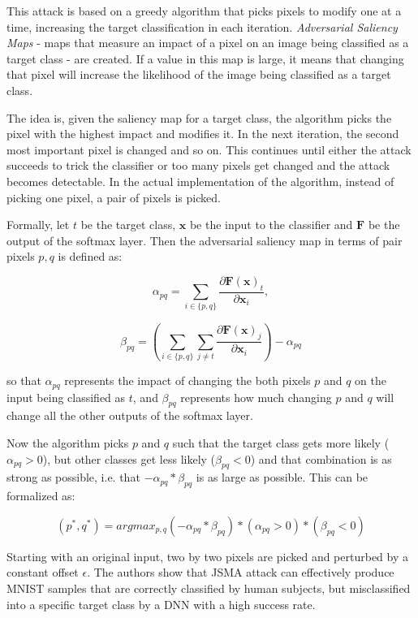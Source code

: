 This attack is based on a greedy algorithm that picks pixels to modify one at a time, increasing the target classification in each iteration.  \textit{Adversarial Saliency Maps} - maps that measure an impact of a pixel on an image being classified as a target class - are created. If a value in this map is large, it means that changing that pixel will increase the likelihood of the image being classified as a target class. 

The idea is, given the saliency map for a target class, the algorithm picks the pixel with the highest impact and modifies it. In the next iteration, the second most important pixel is changed and so on. This continues until either the attack succeeds to trick the classifier or too many pixels get changed and the attack becomes detectable. In the actual implementation of the algorithm, instead of picking one pixel, a pair of pixels is picked.

Formally, let $t$ be the target class, $\pmb x$ be the input to the classifier and $\pmb F$ be the output of the softmax layer. Then the adversarial saliency map in terms of pair pixels $p, q$ is defined as:

\[
\alpha_{pq} = \sum_{i \in \{p,q\}} \frac{\partial \pmb F(\pmb x)_t}{\partial \pmb x_i},
\]

\[
\beta_{pq} = ( \sum_{i \in \{p,q\}} \sum_{j \neq t} \frac{\partial \pmb F (\pmb x)_j }{\partial \pmb x _i}) - \alpha_{pq}
\]

so that $\alpha_{pq}$ represents the impact of changing the both pixels $p$ and $q$ on the input being classified as $t$, and $\beta_{pq}$ represents how
much changing $p$ and $q$ will change all the other outputs of the softmax layer.

Now the algorithm picks $p$ and $q$ such that the target class gets more likely ( $\alpha_{pq} > 0$), but other classes get less likely ($\beta_{pq} < 0$) and that combination is as strong as possible, i.e. that $ - \alpha_{pq} * \beta_{pq}$ is as large as possible. This can be formalized as:

\[
(p^*, q^*) = arg max_{p, q} (- \alpha_{pq} * \beta_{pq}) * (\alpha_{pq} > 0) * (\beta_{pq} < 0)
\]

Starting with an original input, two by two pixels are picked and perturbed by a constant offset $\epsilon$. The authors \cite{DBLP:journals/corr/PapernotMJFCS15}show that JSMA attack can effectively produce MNIST samples that are correctly classified by human subjects, but misclassified into a specific target class by a DNN with a high success rate. 
